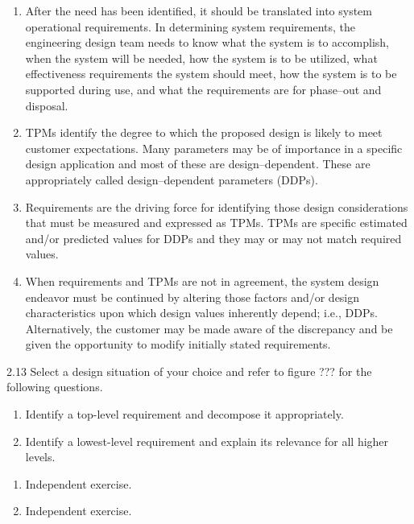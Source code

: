 \begin{exsol@solution}{}
        \begin{enumerate}[label=\alph*)]
            \item After the need has been identified, it should be translated into system operational requirements. In determining system requirements, the engineering design team needs to know what the system is to accomplish, when the system will be needed, how the system is to be utilized, what effectiveness requirements the system should meet, how the system is to be supported during use, and what the requirements are for phase–out and disposal.
            \item TPMs identify the degree to which the proposed design is likely to meet customer expectations. Many parameters may be of importance in a specific design application and most of these are design–dependent. These are appropriately called design–dependent parameters (DDPs).
            \item Requirements are the driving force for identifying those design considerations that must be measured and expressed as TPMs. TPMs are specific estimated and/or predicted values for DDPs and they may or may not match required values.
            \item When requirements and TPMs are not in agreement, the system design endeavor must be continued by altering those factors and/or design characteristics upon which design values inherently depend; i.e., DDPs. Alternatively, the customer may be made aware of the discrepancy and be given the opportunity to modify initially stated requirements.
        \end{enumerate}
\end{exsol@solution}
\begin{exsol@exercise}{2.13}
    \label{sea-2-18_20}
        Select a design situation of your choice and refer to figure ??? for the following questions.
        \begin{enumerate}[label=\alph*)]
            \item Identify a top-level requirement and decompose it appropriately.
            \item Identify a lowest-level requirement and explain its relevance for all higher levels.
        \end{enumerate}
\end{exsol@exercise}
\begin{exsol@solution}{}
        \begin{enumerate}[label=\alph*)]
            \item Independent exercise.
            \item Independent exercise.
        \end{enumerate}
\end{exsol@solution}
